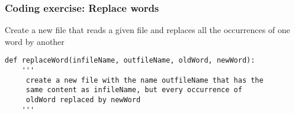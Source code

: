 \documentclass{beamer}
\begin{document}
\begin{frame}[fragile]
\frametitle{Coding exercise: Replace words}
Create a new file that reads a given file and replaces all the occurrences of one word by another
\begin{small}
\begin{verbatim}
def replaceWord(infileName, outfileName, oldWord, newWord):
	'''
     create a new file with the name outfileName that has the
     same content as infileName, but every occurrence of
     oldWord replaced by newWord
	'''
\end{verbatim}
\end{small}


\end{frame}
\end{document}
